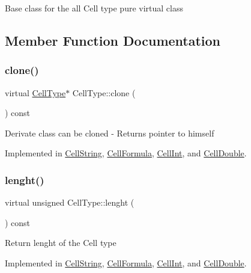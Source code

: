 Base class for the all Cell type pure virtual class 

\subsection{Member Function Documentation}
\mbox{\label{class_cell_type_a8c534b1eed27659429f761fc76d51b89}} 
\subsubsection{\texorpdfstring{clone()}{clone()}}
{\footnotesize\ttfamily virtual \hyperlink{class_cell_type}{Cell\+Type}$\ast$ Cell\+Type\+::clone (\begin{DoxyParamCaption}{ }\end{DoxyParamCaption}) const\hspace{0.3cm}{\ttfamily [pure virtual]}}

Derivate class can be cloned -\/ Returns pointer to himself 

Implemented in \hyperlink{class_cell_string_a293639128fa52df8f72f88335e23d2f0}{Cell\+String}, \hyperlink{class_cell_formula_a23c26c40ef7056d9395ed8bc4ebef3b9}{Cell\+Formula}, \hyperlink{class_cell_int_a767b15d99c5ec0e2594dc35300e51873}{Cell\+Int}, and \hyperlink{class_cell_double_a8d378687ae89338267e61d61ff932680}{Cell\+Double}.

\mbox{\label{class_cell_type_a1f8bd268dbd474dd8e08726a6efac066}} 
\subsubsection{\texorpdfstring{lenght()}{lenght()}}
{\footnotesize\ttfamily virtual unsigned Cell\+Type\+::lenght (\begin{DoxyParamCaption}{ }\end{DoxyParamCaption}) const\hspace{0.3cm}{\ttfamily [pure virtual]}}

Return lenght of the Cell type 

Implemented in \hyperlink{class_cell_string_a6a8f5570104283eb4bb8e9ed4b998fb7}{Cell\+String}, \hyperlink{class_cell_formula_af188e3f639245c126e0ae30e17b8d3c0}{Cell\+Formula}, \hyperlink{class_cell_int_afcab8270ff1853a08460051e02e62ace}{Cell\+Int}, and \hyperlink{class_cell_double_ac2d36517f1107fb0271172ea30d6bff5}{Cell\+Double}.

